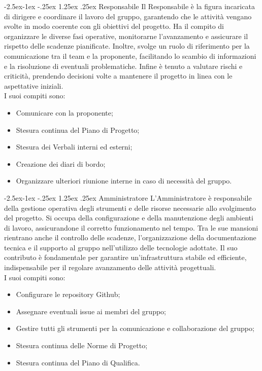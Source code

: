 \documentclass[a4paper,12pt]{article}
\makeatletter
\renewcommand\paragraph{\@startsection{paragraph}{4}{\z@}%
            {-2.5ex\@plus -1ex \@minus -.25ex}%
            {1.25ex \@plus .25ex}%
            {\normalfont\normalsize\bfseries}}
\makeatother
\begin{document}
            \paragraph{Responsabile}
                Il Responsabile è la figura incaricata di dirigere e coordinare il lavoro del gruppo, garantendo che le attività vengano svolte in modo coerente con gli obiettivi del progetto.
                Ha il compito di organizzare le diverse fasi operative, monitorarne l'avanzamento e assicurare il rispetto delle scadenze pianificate.
                Inoltre, svolge un ruolo di riferimento per la comunicazione tra il team e la proponente, facilitando lo scambio di informazioni e la risoluzione di eventuali problematiche.
                Infine è tenuto a valutare rischi e criticità, prendendo decisioni volte a mantenere il progetto in linea con le aspettative iniziali.\\
                I suoi compiti sono:
                \begin{itemize}
                    \item Comunicare con la proponente;
                    \item Stesura continua del Piano di Progetto;
                    \item Stesura dei Verbali interni ed esterni;
                    \item Creazione dei diari di bordo;
                    \item Organizzare ulteriori riunione interne in caso di necessità del gruppo.
                \end{itemize}

            \paragraph{Amministratore}
                L'Amministratore è responsabile della gestione operativa degli strumenti e delle risorse necessarie allo svolgimento del progetto.
                Si occupa della configurazione e della manutenzione degli ambienti di lavoro, assicurandone il corretto funzionamento nel tempo.
                Tra le sue mansioni rientrano anche il controllo delle scadenze, l'organizzazione della documentazione tecnica e il supporto al gruppo nell'utilizzo delle tecnologie adottate.
                Il suo contributo è fondamentale per garantire un'infrastruttura stabile ed efficiente, indispensabile per il regolare avanzamento delle attività progettuali.\\
                I suoi compiti sono:
                \begin{itemize}
                    \item Configurare le repository Github;
                    \item Assegnare eventuali issue ai membri del gruppo;
                    \item Gestire tutti gli strumenti per la comunicazione e collaborazione del gruppo;
                    \item Stesura continua delle Norme di Progetto;
                    \item Stesura continua del Piano di Qualifica.
                \end{itemize}
\end{document}
